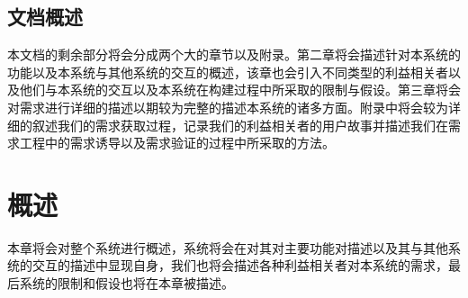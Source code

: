 \documentclass{ctexrep}
\begin{document}
\section{文档概述}
本文档的剩余部分将会分成两个大的章节以及附录。第二章将会描述针对本系统的功能以及本系统与其他系统的交互的概述，该章也会引入不同类型的利益相关者以及他们与本系统的交互以及本系统在构建过程中所采取的限制与假设。第三章将会对需求进行详细的描述以期较为完整的描述本系统的诸多方面。附录中将会较为详细的叙述我们的需求获取过程，记录我们的利益相关者的用户故事并描述我们在需求工程中的需求诱导以及需求验证的过程中所采取的方法。



\chapter{概述}
本章将会对整个系统进行概述，系统将会在对其对主要功能对描述以及其与其他系统的交互的描述中显现自身，我们也将会描述各种利益相关者对本系统的需求，最后系统的限制和假设也将在本章被描述。
\end{document}
